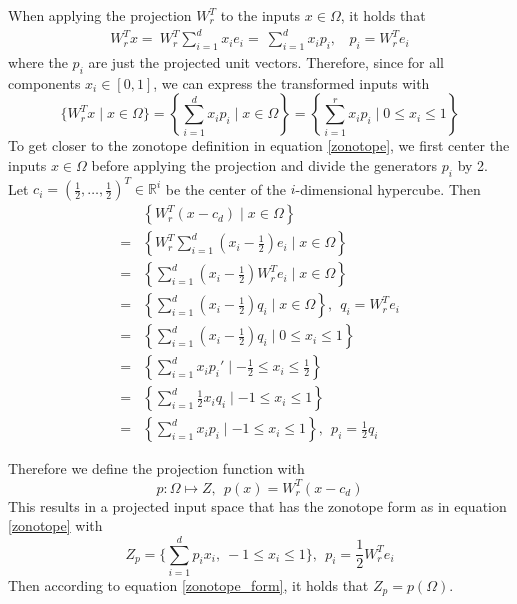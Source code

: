 \documentclass[
  a4paper,  %
  twoside,  %
  bibliography=totoc,
  headsepline,
  cleardoublepage=empty,
  parskip=half,
  draft=false
]{scrbook}
\begin{document}
When applying the projection $W_r^T$ to the inputs $x \in \Omega$, it holds that
\begin{equation}
\begin{split}
W_r^T x=~W_r^T \sum_{i=1}^d x_i e_i=~\sum_{i=1}^d x_i p_i , ~~~~ p_i=W_r^T e_i
\end{split}
\end{equation}
where the $p_i$ are just the projected unit vectors.
Therefore, since for all components $x_i \in [0,1]$, we can express the transformed inputs with
\begin{equation}
\{W_r^T x \mid x \in \Omega\}=\left\{\sum_{i=1}^d x_i p_i \mid x \in \Omega \right\}=\left\{ \sum_{i=1}^r x_i p_i \mid 0 \leq x_i \leq 1\right\}
\end{equation}
To get closer to the zonotope definition in equation \ref{zonotope}, we first center the inputs $x \in \Omega$ before applying the projection and divide the generators $p_i$ by 2.
Let $c_i=(\frac{1}{2}, \dots, \frac{1}{2})^T\in \mathbb{R}^i$ be the center of the $i$-dimensional hypercube.
Then
\begin{equation}
\begin{split}
&\left\{W_r^T (x - c_d) \mid x \in \Omega\right\}\\
=&\left\{W_r^T \sum_{i=1}^d (x_i - \frac{1}{2}) e_i \mid x \in \Omega \right\}\\
=&\left\{\sum_{i=1}^d (x_i - \frac{1}{2}) W_r^T e_i \mid x \in \Omega \right\}\\
=&\left\{\sum_{i=1}^d (x_i - \frac{1}{2}) q_i \mid x \in \Omega \right\}, ~~ q_i=W_r^T e_i\\
=&\left\{\sum_{i=1}^d (x_i - \frac{1}{2}) q_i \mid 0 \leq x_i \leq 1 \right\}\\
=&\left\{\sum_{i=1}^d x_i p_i' \mid -\frac{1}{2} \leq x_i \leq \frac{1}{2} \right\}\\
=&\left\{\sum_{i=1}^d \frac{1}{2} x_i q_i \mid -1 \leq x_i \leq 1 \right\}\\
=&\left\{\sum_{i=1}^d x_i p_i \mid -1 \leq x_i \leq 1 \right\}, ~~ p_i=\frac{1}{2} q_i
\label{zonotope_form}
\end{split}
\end{equation}

Therefore we define the projection function with
\begin{equation}
p \colon \Omega \mapsto Z, ~~ p(x)=W_r^T (x-c_d)
\end{equation}
This results in a projected input space that has the zonotope form as in equation \ref{zonotope} with
\begin{equation}
Z_{p}=\{\sum_{i=1}^d p_i x_i , ~ -1 \leq x_i \leq 1\}, ~~ p_i=\frac{1}{2} W_r^T e_i
\end{equation}
Then according to equation \ref{zonotope_form}, it holds that $Z_{p}=p(\Omega)$.
\end{document}
